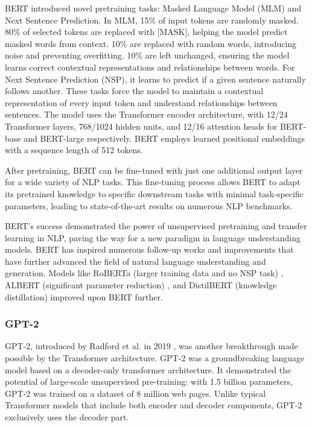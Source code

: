 \documentclass[a4paper, oneside]{discothesis}
\begin{document}
BERT introduced novel pretraining tasks: Masked Language Model (MLM) and Next Sentence Prediction. In MLM, 15\% of input tokens are randomly masked. 80\% of selected tokens are replaced with [MASK], helping the model predict masked words from context. 10\% are replaced with random words, introducing noise and preventing overfitting. 10\% are left unchanged, ensuring the model learns correct contextual representations and relationships between words. For Next Sentence Prediction (NSP), it learns to predict if a given sentence naturally follows another. These tasks force the model to maintain a contextual representation of every input token and understand relationships between sentences.
The model uses the Transformer encoder architecture, with 12/24 Transformer layers, 768/1024 hidden units, and 12/16 attention heads for BERT-base and BERT-large respectively. BERT employs learned positional embeddings with a sequence length of 512 tokens.

After pretraining, BERT can be fine-tuned with just one additional output layer for a wide variety of NLP tasks.
This fine-tuning process allows BERT to adapt its pretrained knowledge to specific downstream tasks with minimal task-specific parameters, leading to state-of-the-art results on numerous NLP benchmarks.

BERT's success demonstrated the power of unsupervised pretraining and transfer learning in NLP, paving the way for a new paradigm in language understanding models. BERT has inspired numerous follow-up works and improvements that have further advanced the field of natural language understanding and generation. Models like RoBERTa (larger training data and no NSP task) \cite{liu2019roberta}, ALBERT (significant parameter reduction) \cite{lan2020albert}, and DistilBERT (knowledge distillation) \cite{sanh2020distilbert} improved upon BERT further.

\subsubsection{GPT-2}
GPT-2, introduced by Radford et al. in 2019 \cite{radford2019language}, was another breakthrough made possible by the Transformer architecture. GPT-2 was a groundbreaking language model based on a decoder-only transformer architecture. It demonstrated the potential of large-scale unsupervised pre-training: with 1.5 billion parameters, GPT-2 was trained on a dataset of 8 million web pages. Unlike typical Transformer models that include both encoder and decoder components, GPT-2 exclusively uses the decoder part.
\end{document}
